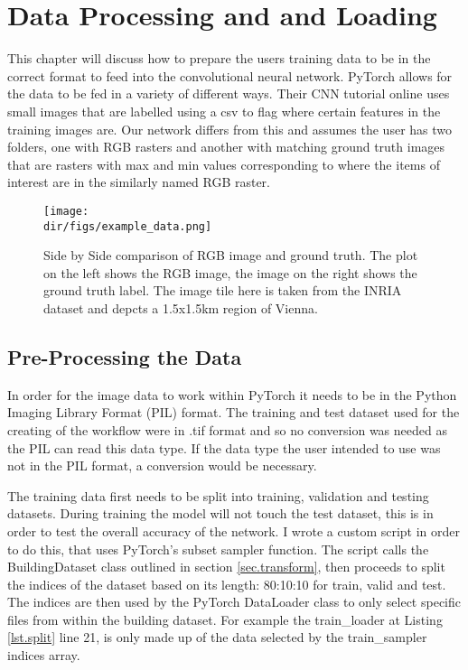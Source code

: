 \chapter{Data Processing and and Loading}
This chapter will discuss how to prepare the users training data to be in the correct format to feed into the convolutional neural network. PyTorch allows for the data to be fed in a variety of different ways. Their CNN tutorial online uses small images that are labelled using a csv to flag where certain features in the training images are. Our network differs from this and assumes the user has two folders, one with RGB rasters and another with matching ground truth images that are rasters with max and min values corresponding to where the items of interest are in the similarly named RGB raster. 

\begin{figure}[htbp]
    \centering
    \texttt{[image: \\dir/figs/example\_data.png]}
    \caption[Side by Side comparison of RGB image and ground truth]{Side by Side comparison of RGB image and ground truth. The plot on the left shows the RGB image, the image on the right shows the ground truth label. The image tile here is taken from the INRIA dataset and depcts a 1.5x1.5km region of Vienna.}
    \label{fig.example_data}
\end{figure}


\section{Pre-Processing the Data}
In order for the image data to work within PyTorch it needs to be in the Python Imaging Library Format (PIL) format. The training and test dataset used for the creating of the workflow were in .tif format and so no conversion was needed as the PIL can read this data type. If the data type the user intended to use was not in the PIL format, a conversion would be necessary.
\par
The training data first needs to be split into training, validation and testing datasets. During training the model will not touch the test dataset, this is in order to test the overall accuracy of the network. I wrote a custom script in order to do this, that uses PyTorch's subset sampler function. The script calls the BuildingDataset class outlined in section \ref{sec.transform}, then proceeds to split the indices of the dataset based on its length: 80:10:10 for train, valid and test. The indices are then used by the PyTorch DataLoader class to only select specific files from within the building dataset. For example the train\_loader at  Listing \ref{lst.split} line 21, is only made up of the data selected by the train\_sampler indices array. 

